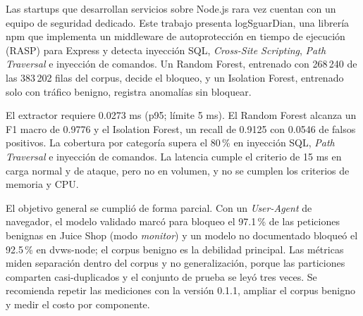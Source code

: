 Las startups que desarrollan servicios sobre Node.js rara vez cuentan con un equipo de seguridad dedicado. Este trabajo presenta logSguarDian, una librería npm que implementa un middleware de autoprotección en tiempo de ejecución (RASP) para Express y detecta inyección SQL, \textit{Cross-Site Scripting}, \textit{Path Traversal} e inyección de comandos. Un Random Forest, entrenado con 268\,240 de las 383\,202 filas del corpus, decide el bloqueo, y un Isolation Forest, entrenado solo con tráfico benigno, registra anomalías sin bloquear.

El extractor requiere 0.0273 ms (p95; límite 5 ms). El Random Forest alcanza un F1 macro de 0.9776 y el Isolation Forest, un recall de 0.9125 con 0.0546 de falsos positivos. La cobertura por categoría supera el 80\,\% en inyección SQL, \textit{Path Traversal} e inyección de comandos. La latencia cumple el criterio de 15 ms en carga normal y de ataque, pero no en volumen, y no se cumplen los criterios de memoria y CPU.

El objetivo general se cumplió de forma parcial. Con un \textit{User-Agent} de navegador, el modelo validado marcó para bloqueo el 97.1\,\% de las peticiones benignas en Juice Shop (modo \textit{monitor}) y un modelo no documentado bloqueó el 92.5\,\% en dvws-node; el corpus benigno es la debilidad principal. Las métricas miden separación dentro del corpus y no generalización, porque las particiones comparten casi-duplicados y el conjunto de prueba se leyó tres veces. Se recomienda repetir las mediciones con la versión 0.1.1, ampliar el corpus benigno y medir el costo por componente.
